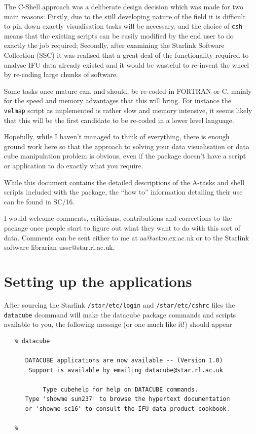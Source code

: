 \documentclass[twoside,11pt]{article}
\newcommand{\htmladdnormallink}[2]{#1}
\newcommand{\htmlref}[2]{#1}
\newcommand{\xref}[3]{#1}
\newcommand{\xlabel}[1]{}
\begin{document}
The C-Shell approach was a deliberate design decision which was made for two main reasons: Firstly, due to the still developing nature of the field it is difficult to pin down exactly visualisation tasks will be necessary, and the choice of {\tt csh} means that the existing scripts can be easily modified by the end user to do exactly the job required; Secondly, after examining the Starlink Software Collection (SSC) it was realised that a great deal of the functionality required to analyse IFU data already existed and it would be wasteful to re-invent the wheel by re-coding large chunks of software.

Some tasks once mature can, and should, be re-coded in FORTRAN or C, mainly for the speed and memory advantages that this will bring. For instance the \htmlref{{\tt velmap}}{velmap} script as implemented is rather slow and memory intensive, it seems likely that this will be the first candidate to be re-coded in a lower level language.

Hopefully, while I haven't managed to think of everything, there is enough ground work here so that the approach to solving your data visualisation or data cube manipulation problem is obvious, even if the package doesn't have a script or application to do exactly what you require. 

While this document contains the detailed descriptions of the A-tasks and shell scripts included with the package, the ``how to'' information  detailing their use can be found in \xref{SC/16}{sc16}{}.

I would welcome comments, criticisms, contributions and corrections to the package once people start to figure out what they want to do with this sort of data.  Comments can be sent either to me at \htmladdnormallink{aa@astro.ex.ac.uk}{mailto:aa@astro.ex.ac.uk} or to the Starlink software librarian \htmladdnormallink{ussc@star.rl.ac.uk}{mailto:ussc@star.rl.ac.uk}. 

\section{\xlabel{sun237_starting}Setting up the applications\label{sun237_starting}}

After sourcing the Starlink {\tt /star/etc/login} and {\tt /star/etc/cshrc} files the {\tt datacube} dcommand will make the datacube package commands and scripts available to you, the following message (or one much like it!) should appear

\small\begin{verbatim}
   % datacube
    
      DATACUBE applications are now available -- (Version 1.0)
       Support is available by emailing datacube@star.rl.ac.uk
    
           Type cubehelp for help on DATACUBE commands.
      Type 'showme sun237' to browse the hypertext documentation
      or 'showme sc16' to consult the IFU data product cookbook.
  
   %
\end{verbatim}\normalsize
\end{document}
